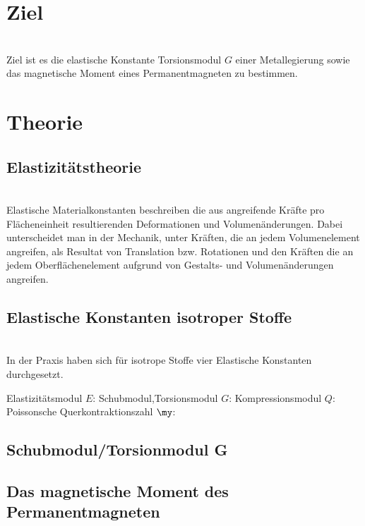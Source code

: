 \section{Ziel}
\\
Ziel ist es die elastische Konstante Torsionsmodul $G$ einer Metallegierung sowie das magnetische Moment eines Permanentmagneten zu bestimmen.


\section{Theorie}
\subsection{Elastizitätstheorie}
\\
Elastische Materialkonstanten beschreiben die aus angreifende Kräfte pro Flächeneinheit resultierenden Deformationen und Volumenänderungen.
Dabei unterscheidet man in der Mechanik, unter Kräften, die an jedem Volumenelement angreifen, als Resultat von Translation bzw. Rotationen und
den Kräften die an jedem Oberflächenelement aufgrund von Gestalts- und Volumenänderungen angreifen.



\subsection{Elastische Konstanten isotroper Stoffe}
\\
In der Praxis haben sich für isotrope Stoffe vier Elastische Konstanten durchgesetzt.

Elastizitätsmodul $E$:
Schubmodul,Torsionsmodul $G$:
Kompressionsmodul $Q$:
Poissonsche Querkontraktionszahl $\my$:


\subsection{Schubmodul/Torsionmodul G}
\subsection{Das magnetische Moment des Permanentmagneten}
\label{sec:Theorie}
